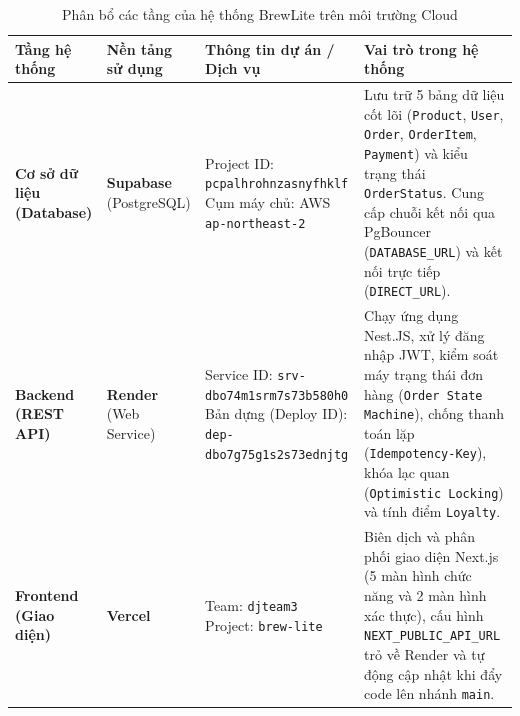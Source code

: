 \begin{table}[H]
\centering
\caption{Phân bổ các tầng của hệ thống BrewLite trên môi trường Cloud}
\vspace{0.2cm}
\begin{tabular}{|p{2.5cm}|p{2.6cm}|p{4.3cm}|p{5.5cm}|}
\hline
\textbf{Tầng hệ thống} & \textbf{Nền tảng sử dụng} & \textbf{Thông tin dự án / Dịch vụ} & \textbf{Vai trò trong hệ thống} \\ \hline
\textbf{Cơ sở dữ liệu (Database)} & \textbf{Supabase} \newline (PostgreSQL) & Project ID: \newline \texttt{pcpalhrohnzasnyfhklf} \newline Cụm máy chủ: \newline AWS \texttt{ap-northeast-2} & Lưu trữ 5 bảng dữ liệu cốt lõi (\texttt{Product}, \texttt{User}, \texttt{Order}, \texttt{OrderItem}, \texttt{Payment}) và kiểu trạng thái \texttt{OrderStatus}. Cung cấp chuỗi kết nối qua PgBouncer (\texttt{DATABASE\_URL}) và kết nối trực tiếp (\texttt{DIRECT\_URL}). \\ \hline
\textbf{Backend (REST API)} & \textbf{Render} \newline (Web Service) & Service ID: \newline \texttt{srv-dbo74m1srm7s73b580h0} \newline Bản dựng (Deploy ID): \newline \texttt{dep-dbo7g75g1s2s73ednjtg} & Chạy ứng dụng Nest.JS, xử lý đăng nhập JWT, kiểm soát máy trạng thái đơn hàng (\texttt{Order State Machine}), chống thanh toán lặp (\texttt{Idempotency-Key}), khóa lạc quan (\texttt{Optimistic Locking}) và tính điểm \texttt{Loyalty}. \\ \hline
\textbf{Frontend (Giao diện)} & \textbf{Vercel} & Team: \texttt{djteam3} \newline Project: \texttt{brew-lite} & Biên dịch và phân phối giao diện Next.js (5 màn hình chức năng và 2 màn hình xác thực), cấu hình \texttt{NEXT\_PUBLIC\_API\_URL} trỏ về Render và tự động cập nhật khi đẩy code lên nhánh \texttt{main}. \\ \hline
\end{tabular}
\label{tab:cloud-overview}
\end{table}

